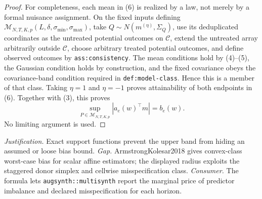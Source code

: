 \documentclass{article}
\begin{document}
\begin{proof}
For completeness, each mean in (6) is realized by a law, not merely by a
formal nuisance assignment.  On the fixed inputs defining
\(\mathcal M_{N,T,K,p}(L,\delta,\sigma_{\min},\sigma_{\max})\), take
\(Q\sim N(m^{(\eta)},\Sigma_Q)\), use its deduplicated coordinates as the
untreated potential outcomes on \(\mathcal C\), extend the untreated array
arbitrarily outside \(\mathcal C\), choose arbitrary treated potential
outcomes, and define observed outcomes by \texttt{ass:consistency}.  The mean
conditions hold by (4)--(5), the Gaussian condition holds by construction,
and the fixed covariance obeys the covariance-band condition required in
\texttt{def:model-class}.  Hence this is a member of that class.  Taking
\(\eta=1\) and \(\eta=-1\) proves attainability of both endpoints in (6).
Together with (3), this proves
\[
 \sup_{P\in\mathcal M_{N,T,K,p}}
 |a_e(w)^{\top}m|=b_e(w).
\]
No limiting argument is used.
\end{proof}
\par\smallskip\noindent \textit{Justification.} Exact support functions prevent the upper band from hiding an assumed or loose bias bound. \textit{Gap.} ArmstrongKolesar2018 gives convex-class worst-case bias for scalar affine estimators; the displayed radius exploits the staggered donor simplex and cellwise misspecification class. \textit{Consumer.} The formula lets \texttt{augsynth::multisynth} report the marginal price of predictor imbalance and declared misspecification for each horizon.
\end{document}
